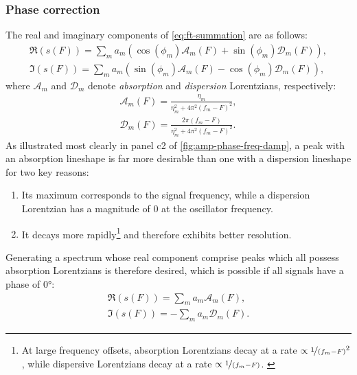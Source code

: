 \subsubsection{Phase correction}
The real and imaginary components of \cref{eq:ft-summation} are as follows:
\begin{subequations}
    \begin{gather}
        \Re(s(F)) = \sum_m
        a_m (\cos(\phi_m) \mathcal{A}_m(F) + \sin(\phi_m) \mathcal{D}_m(F)),\\
        \Im(s(F)) = \sum_m
        a_m (\sin(\phi_m) \mathcal{A}_m(F) - \cos(\phi_m) \mathcal{D}_m(F)),
    \end{gather}
\end{subequations}
where $\mathcal{A}_m$ and  $\mathcal{D}_m$ denote \emph{absorption} and
\emph{dispersion} Lorentzians, respectively:
\begin{subequations}
    \begin{gather}
        \mathcal{A}_m(F) = \frac{\eta_m}{\eta_m^2 + 4 \pi^2 (f_m - F)^2},\\
        \mathcal{D}_m(F) = \frac{2 \pi (f_m - F)}{\eta_m^2 + 4 \pi^2 (f_m - F)^2}.
    \end{gather}
\end{subequations}
As illustrated most clearly in panel c2 of
\cref{fig:amp-phase-freq-damp}, a peak with an absorption lineshape is far more
desirable than one with a dispersion lineshape for two key
reasons:
\begin{enumerate}
    \item Its maximum corresponds to the signal frequency, while a dispersion
        Lorentzian has a magnitude of $0$ at the oscillator frequency.
    \item It decays more rapidly\footnote{
            At large frequency offsets, absorption Lorentzians decay at a rate
            $\propto \nicefrac{1}{(f_m - F)}^2$, while dispersive Lorentzians
            decay at a rate $\propto \nicefrac{1}{(f_m - F)}$.
            \label{fn:lorentzian-decay}
        } and therefore exhibits better resolution.
\end{enumerate}
Generating a spectrum whose real component comprise peaks which all possess
absorption Lorentzians is therefore desired, which is possible if all signals
have a phase of \ang{0}:
\begin{subequations}
    \begin{gather}
        \Re(s(F)) = \sum_m a_m \mathcal{A}_m(F),\label{eq:absorption}\\
        \Im(s(F)) = -\sum_m a_m \mathcal{D}_m(F).\label{eq:dispersion}
    \end{gather}
\end{subequations}
